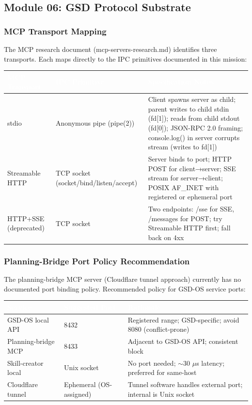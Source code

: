 \documentclass[11pt,letterpaper]{article}
\newcommand{\tableheader}[1]{\textbf{\sffamily\textcolor{white}{#1}}}
\begin{document}
\subsection{Module 06: GSD Protocol Substrate}

\subsubsection{MCP Transport Mapping}

The MCP research document (mcp-servers-research.md) identifies three transports. Each maps directly to the IPC primitives documented in this mission:

\begin{center}
\begin{tabularx}{\textwidth}{L{3cm}L{3cm}X}
\toprule
{}
\tableheader{MCP Transport} & \tableheader{IPC Primitive} & \tableheader{Specification Notes} \\
\midrule
stdio & Anonymous pipe (pipe(2)) & Client spawns server as child; parent writes to child stdin (fd[1]); reads from child stdout (fd[0]); JSON-RPC 2.0 framing; console.log() in server corrupts stream (writes to fd[1]) \\
Streamable HTTP & TCP socket (socket/bind/listen/accept) & Server binds to port; HTTP POST for client→server; SSE stream for server→client; POSIX AF\_INET with registered or ephemeral port \\
HTTP+SSE (deprecated) & TCP socket & Two endpoints: /sse for SSE, /messages for POST; try Streamable HTTP first; fall back on 4xx \\
\bottomrule
\end{tabularx}
\end{center}

\subsubsection{Planning-Bridge Port Policy Recommendation}

The planning-bridge MCP server (Cloudflare tunnel approach) currently has no documented port binding policy. Recommended policy for GSD-OS service ports:

\begin{center}
\begin{tabularx}{\textwidth}{L{3.5cm}L{2cm}X}
\toprule
{}
\tableheader{Service} & \tableheader{Suggested Port} & \tableheader{Rationale} \\
\midrule
GSD-OS local API & 8432 & Registered range; GSD-specific; avoid 8080 (conflict-prone) \\
Planning-bridge MCP & 8433 & Adjacent to GSD-OS API; consistent block \\
Skill-creator local & Unix socket & No port needed; $\sim$30 $\mu$s latency; preferred for same-host \\
Cloudflare tunnel & Ephemeral (OS-assigned) & Tunnel software handles external port; internal is Unix socket \\
\bottomrule
\end{tabularx}
\end{center}
\end{document}
